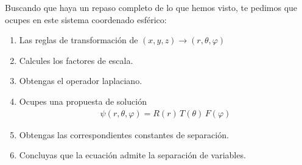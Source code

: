 Buscando que haya un repaso completo de lo que hemos visto, te pedimos que ocupes en este sistema coordenado esférico:
\begin{enumerate}
\item Las reglas de transformación de $(x, y, z) \to (r, \theta, \varphi)$
\item Calcules los factores de escala.
\item Obtengas el operador laplaciano.
\item Ocupes una propuesta de solución
\begin{align*}
\psi(r, \theta, \varphi) = R(r)\, T(\theta) \, F(\varphi)
\end{align*}
\item Obtengas las correspondientes constantes de separación.
\item Concluyas que la ecuación admite la separación de variables.
\end{enumerate}
